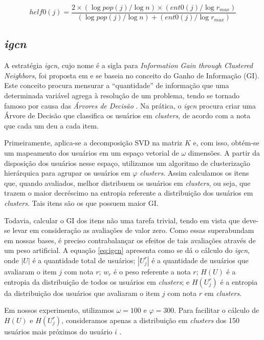 \begin{equation}
helf0(j) = \frac{2 \times (\log pop(j)/\log n) \times (ent0(j)/\log r_{max})}{(\log pop(j)/\log n) + (ent0(j)/\log r_{max})}
\label{eq:helf0}
\end{equation}

\subsection{\textit{igcn}}
A estratégia \textit{igcn}, cujo nome é a sigla para \textit{Information Gain through Clustered Neighbors}, foi proposta em \citep{Rashid:2008:LPN:1540276.1540302} e se baseia no conceito do Ganho de Informação (GI). Este conceito procura mensurar a ``quantidade'' de informação que uma determinada variável agrega à resolução de um problema, tendo se tornado famoso por causa das \textit{Árvores de Decisão} \citep{Rokach:2008:DMD:1796114}. Na prática, o \textit{igcn} procura criar uma Árvore de Decisão que classifica os usuários em \textit{clusters}, de acordo com a nota que cada um deu a cada item.


Primeiramente, aplica-se a decomposição SVD na matriz $K$ e, com isso, obtém-se um mapeamento dos usuários em um espaço vetorial de $\omega$ dimensões. A partir da disposição dos usuários nesse espaço, utilizamos um algoritmo de clusterização hierárquica para agrupar os usuários em $\varphi$ \textit{clusters}. Assim calculamos os itens que, quando avaliados, melhor distribuem os usuários em \textit{clusters}, ou seja, que trazem o maior decréscimo na entropia referente a distribuição dos usuários em \textit{clusters}. Tais itens são os que possuem maior GI.

Todavia, calcular o GI dos itens não uma tarefa trivial, tendo em vista que deve-se levar em consideração as avaliações de valor zero. Como essas superabundam em nossas bases, é preciso contrabalançar os efeitos de tais avaliações através de um peso artificial. A equação \ref{eq:igcn} apresenta como se dá o cálculo do \textit{igcn}, onde $|U|$ é a quantidade total de usuários; $|U_{j}^{r}|$ é a quantidade de usuários que avaliaram o item $j$ com nota $r$; $w_r$ é o peso referente a nota $r$; $H(U)$ é a entropia da distribuição de todos os usuários em \textit{clusters}; e $H(U_{j}^{r})$ é a entropia da distribuição dos usuários que avaliaram o item $j$ com nota $r$ em \textit{clusters}. 

Em nossos experimento, utilizamos $\omega=100$ e $\varphi=300$. Para facilitar o cálculo de $H(U)$ e $H(U_{j}^{r})$, consideramos apenas a distribuição em \textit{clusters} dos 150 usuários mais próximos do usuário $i$ \citep{Rashid:2008:LPN:1540276.1540302}. 

